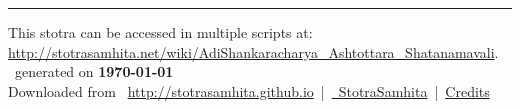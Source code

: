 \documentclass[oneside,12pt]{book}
\begin{document}
\setmainfont[Script=Devanagari,Mapping=tex-text]{Sanskrit 2003}
\fontsize {16}{19.25}\selectfont
\begin{center}

\end{center}
\vfill
\centering
\rule{0.8\textwidth}{0.6pt}

\footnotesize
{}\sffamily
This stotra can be accessed in multiple scripts at:\\
\url{http://stotrasamhita.net/wiki/AdiShankaracharya_Ashtottara_Shatanamavali}.\\[1ex]
\faFilePdfO~generated on \textbf{\today}\\[1ex]
Downloaded from \faGlobe{}~\url{http://stotrasamhita.github.io}~|~\href{https://github.com/StotraSamhita}{\faGithubSquare{}~StotraSamhita}~|~\href{https://stotrasamhita.github.io/about/}{Credits}
\end{document}
